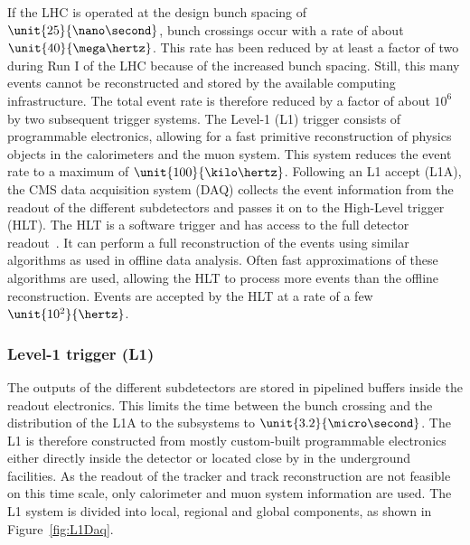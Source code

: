 If the LHC is operated at the design bunch spacing of $\unit{25}{\nano\second}$, bunch crossings occur with a rate of about $\unit{40}{\mega\hertz}$. This rate has been reduced by at least a factor of two during Run I of the LHC because of the increased bunch spacing. Still, this many events cannot be reconstructed and stored by the available computing infrastructure. The total event rate is therefore reduced by a factor of about $10^6$ by two subsequent trigger systems. The Level-1 (L1) trigger consists of programmable electronics, allowing for a fast primitive reconstruction of physics objects in the calorimeters and the muon system. This system reduces the event rate to a maximum of $\unit{100}{\kilo\hertz}$. Following an L1 accept (L1A), the CMS data acquisition system (DAQ) collects the event information from the readout of the different subdetectors and passes it on to the High-Level trigger (HLT). The HLT is a software trigger and has access to the full detector readout~\cite{Adam:2005zf}. It can perform a full reconstruction of the events using similar algorithms as used in offline data analysis. Often fast approximations of these algorithms are used, allowing the HLT to process more events than the offline reconstruction. Events are accepted by the HLT at a rate of a few $\unit{10^2}{\hertz}$.  

\subsubsection*{Level-1 trigger (L1)}
The outputs of the different subdetectors are stored in pipelined buffers inside the readout electronics. This limits the time between the bunch crossing and the distribution of the L1A to the subsystems to $\unit{3.2}{\micro\second}$. The L1 is therefore constructed from mostly custom-built programmable electronics either directly inside the detector or located close by in the underground facilities. As the readout of the tracker and track reconstruction are not feasible on this time scale, only calorimeter and muon system information are used. The L1 system is divided into local, regional and global components, as shown in Figure~\ref{fig:L1Daq}. 

